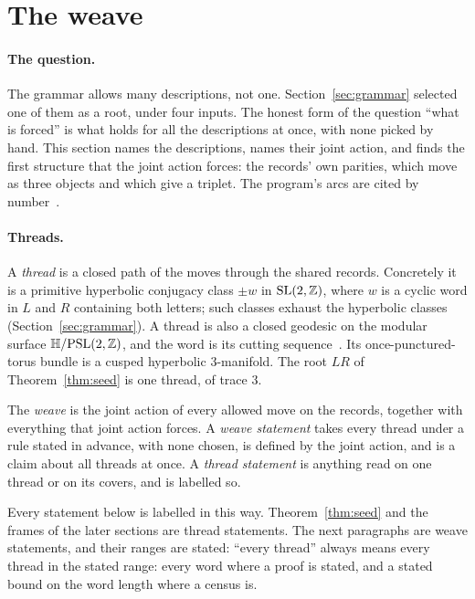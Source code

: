 \section{The weave}\label{sec:weave}

\paragraph{The question.}
The grammar allows many descriptions, not one. Section~\ref{sec:grammar} selected one of them as a root, under four
inputs. The honest form of the question ``what is forced'' is what holds for all the descriptions at once, with none
picked by hand. This section names the descriptions, names their joint action, and finds the first structure that the
joint action forces: the records' own parities, which move as three objects and which give a triplet. The program's
arcs are cited by number~\cite{OriginAxiomRepo}.

\paragraph{Threads.}
A \emph{thread} is a closed path of the moves through the shared records. Concretely it is a primitive hyperbolic
conjugacy class $\pm w$ in $\mathrm{SL}(2,\mathbb{Z})$, where $w$ is a cyclic word in $L$ and $R$ containing both letters; such classes
exhaust the hyperbolic classes (Section~\ref{sec:grammar}). A thread is also a closed geodesic on the modular surface
$\mathbb{H}/\mathrm{PSL}(2,\mathbb{Z})$, and the word is its cutting sequence~\cite{Series1985,Moeckel1982}. Its once-punctured-torus bundle is
a cusped hyperbolic $3$-manifold. The root $LR$ of Theorem~\ref{thm:seed} is one thread, of trace $3$.

\begin{definition}\label{def:weave}
The \emph{weave} is the joint action of every allowed move on the records, together with everything that joint action
forces. A \emph{weave statement} takes every thread under a rule stated in advance, with none chosen, is defined by the
joint action, and is a claim about all threads at once. A \emph{thread statement} is anything read on one thread or on
its covers, and is labelled so.
\end{definition}

Every statement below is labelled in this way. Theorem~\ref{thm:seed} and the frames of the later sections are thread
statements. The next paragraphs are weave statements, and their ranges are stated: ``every thread'' always means every
thread in the stated range: every word where a proof is stated, and a stated bound on the word length where a census is.

